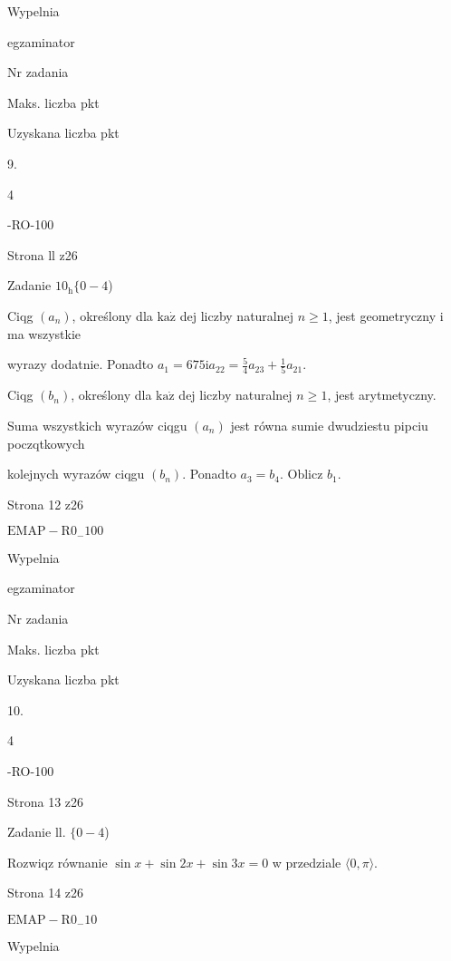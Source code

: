 \documentclass[a4paper,12pt]{article}
\begin{document}
Wypelnia

egzaminator

Nr zadania

Maks. liczba pkt

Uzyskana liczba pkt

9.

4

-RO-100

Strona ll z26





Zadanie $10_{\mathrm{h}}\{0-4$)

Ciqg $(a_{n})$, określony dla $\mathrm{k}\mathrm{a}\dot{\mathrm{z}}$ dej liczby naturalnej $n\geq 1$, jest geometryczny i ma wszystkie

wyrazy dodatnie. Ponadto $a_{1}=675 \mathrm{i} a_{22}=\displaystyle \frac{5}{4}a_{23}+\frac{1}{5}a_{21}.$

Ciqg $(b_{n})$, określony dla $\mathrm{k}\mathrm{a}\dot{\mathrm{z}}$ dej liczby naturalnej $n\geq 1$, jest arytmetyczny.

Suma wszystkich wyrazów ciqgu $(a_{n})$ jest równa sumie dwudziestu pipciu poczqtkowych

kolejnych wyrazów ciqgu $(b_{n})$. Ponadto $a_{3}=b_{4}$. Oblicz $b_{1}.$

Strona 12 z26

$\mathrm{E}\mathrm{M}\mathrm{A}\mathrm{P}-\mathrm{R}0_{-}100$





Wypelnia

egzaminator

Nr zadania

Maks. liczba pkt

Uzyskana liczba pkt

10.

4

-RO-100

Strona 13 z26





Zadanie ll. $\{0-4$)

Rozwiqz równanie $\sin x+\sin 2x+\sin 3x=0$ w przedziale $\langle 0, \pi\rangle.$

Strona 14 z26

$\mathrm{E}\mathrm{M}\mathrm{A}\mathrm{P}-\mathrm{R}0_{-}10$





Wypelnia
\end{document}
